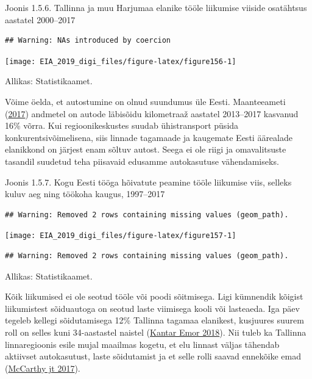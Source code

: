 \documentclass[estonian,]{article}
\begin{document}
{Joonis 1.5.6.} Tallinna ja muu Harjumaa elanike tööle liikumise viiside osatähtsus aastatel 2000--2017

\begin{verbatim}
## Warning: NAs introduced by coercion
\end{verbatim}

\begin{center}\texttt{[image: EIA\_2019\_digi\_files/figure-latex/figure156-1]} \end{center}

\begin{imgsource}
{Allikas:} Statistikaamet.
\end{imgsource}

Võime öelda, et autostumine on olnud suundumus üle Eesti. Maanteeameti (\protect\hyperlink{Maanteeamet2017}{2017}) andmetel on autode läbisõidu kilometraaž aastatel 2013--2017 kasvanud 16\% võrra. Kui regioonikeskustes suudab ühistransport püsida konkurentsivõimelisena, siis linnade tagamaade ja kaugemate Eesti äärealade elanikkond on järjest enam sõltuv autost. Seega ei ole riigi ja omavalitsuste tasandil suudetud teha piisavaid edusamme autokasutuse vähendamiseks.

{Joonis 1.5.7.} Kogu Eesti tööga hõivatute peamine tööle liikumise viis, selleks kuluv aeg ning töökoha kaugus, 1997--2017

\begin{verbatim}
## Warning: Removed 2 rows containing missing values (geom_path).
\end{verbatim}

\begin{center}\texttt{[image: EIA\_2019\_digi\_files/figure-latex/figure157-1]} \end{center}

\begin{verbatim}
## Warning: Removed 2 rows containing missing values (geom_path).
\end{verbatim}

\begin{imgsource}
{Allikas:} Statistikaamet.
\end{imgsource}

Kõik liikumised ei ole seotud tööle või poodi sõitmisega. Ligi kümnendik kõigist liikumistest sõiduautoga on seotud laste viimisega kooli või lasteaeda. Iga päev tegeleb kellegi sõidutamisega 12\% Tallinna tagamaa elanikest, kusjuures suurem roll on selles kuni 34-aastastel naistel (\protect\hyperlink{Kantar2018}{Kantar Emor 2018}). Nii tuleb ka Tallinna linnaregioonis esile mujal maailmas kogetu, et elu linnast väljas tähendab aktiivset autokasutust, laste sõidutamist ja et selle rolli saavad ennekõike emad (\protect\hyperlink{McCarthy2017}{McCarthy jt 2017}).
\end{document}
